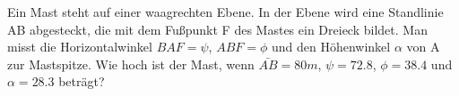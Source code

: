 
Ein Mast steht auf einer waagrechten Ebene. In der Ebene wird eine Standlinie AB abgesteckt,
die mit dem Fußpunkt F des Mastes ein Dreieck bildet. Man misst die
Horizontalwinkel $BAF = \psi$, $ABF = \phi$ und den Höhenwinkel $\alpha$ von A zur Mastspitze.
Wie hoch ist der Mast, wenn $\bar{AB} = 80m$, $\psi = 72.8$, $\phi = 38.4$ und $\alpha = 28.3$
beträgt?
